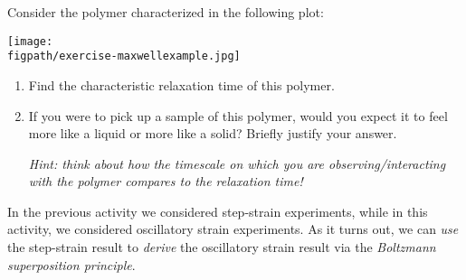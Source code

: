 \begin{activity}
\begin{ctqs}
\begin{enumerate}
		\end{enumerate}
	
\end{ctqs}
	

\clearpage
\begin{exercises}

\exercise Consider the polymer characterized in the following plot:
				
		\centerline{\texttt{[image: \\figpath/exercise-maxwellexample.jpg]}}
		
		\begin{enumerate}
		
			\item Find the characteristic relaxation time of this polymer.
	
					\begin{solution}\end{solution}
	
			\item If you were to pick up a sample of this polymer, would you expect it to feel more like a liquid or more like a solid?  Briefly justify your answer.
	
			\emph{Hint: think about how the timescale on which you are observing/interacting with the polymer compares to the relaxation time!}
	
					\begin{solution}\end{solution}
					
		\end{enumerate}

		\exercise \label{\labelbase:exc:Boltzmann} In the previous activity we considered step-strain experiments, while in this activity, we considered oscillatory strain experiments.  As it turns out, we can \emph{use} the step-strain result to \emph{derive} the oscillatory strain result via the \emph{Boltzmann superposition principle}.
		

\end{exercises}
\end{activity}
